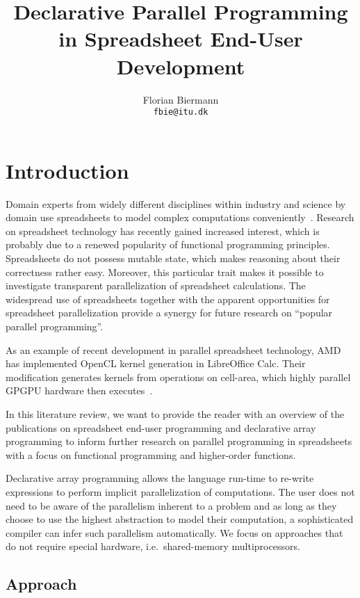 \documentclass[a4paper]{article}
\title{Declarative Parallel Programming in Spreadsheet End-User
  Development}
\author{Florian Biermann\\\small{\texttt{fbie@itu.dk}}}
\begin{document}
\maketitle

\section{Introduction}
\label{sec:intro}

Domain experts from widely different disciplines within industry and
science by domain use spreadsheets to model complex computations
conveniently~\cite{Sestoft2014Spreadsheet}. Research on spreadsheet
technology has recently gained increased interest, which is probably
due to a renewed popularity of functional programming
principles. Spreadsheets do not possess mutable state, which makes
reasoning about their correctness rather easy. Moreover, this
particular trait makes it possible to investigate transparent
parallelization of spreadsheet calculations. The widespread use of
spreadsheets together with the apparent opportunities for spreadsheet
parallelization provide a synergy for future research on ``popular
parallel programming''.

As an example of recent development in parallel spreadsheet
technology, AMD has implemented OpenCL kernel generation in
LibreOffice Calc. Their modification generates kernels from operations
on cell-area, which highly parallel GPGPU hardware then
executes~\cite{Trudeau2015Collaboration}.

In this literature review, we want to provide the reader with an
overview of the publications on spreadsheet end-user programming and
declarative array programming to inform further research on parallel
programming in spreadsheets with a focus on functional programming and
higher-order functions.

Declarative array programming allows the language run-time to re-write
expressions to perform implicit parallelization of computations. The
user does not need to be aware of the parallelism inherent to a
problem and as long as they choose to use the highest abstraction to
model their computation, a sophisticated compiler can infer such
parallelism automatically. We focus on approaches that do not require
special hardware, i.e.\ shared-memory multiprocessors.

\subsection{Approach}
\label{sec:approach}
\end{document}
